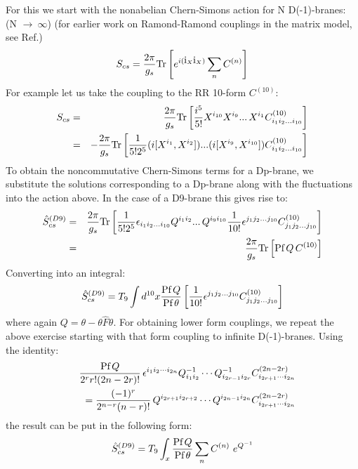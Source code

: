 \documentclass[a4paper,a4paper]{amsproc}
\theoremstyle{definition}
\theoremstyle{remark}
\numberwithin{equation}{section}
\begin{document}
For this we start with the nonabelian Chern-Simons action for N D(-1)-branes:
(N $\rightarrow ~\infty$) \cite{myers} (for earlier work on
Ramond-Ramond couplings in the matrix model, see Ref.\cite{morariu})
%
\begin{equation}
S_{cs} = \frac{2\pi}{g_s} \hbox{Tr}\left[ e^{i(\hbox{i}_X
\hbox{i}_X)}\sum_n C^{(n)}\right]
\end{equation}
%
For example let us take the coupling to the RR 10-form  $C^{(10)}$:
%
\begin{eqnarray}
S_{cs} &=& \frac{2\pi}{g_s}\hbox{Tr}\left[ {\frac{i^5}{5!}}
X^{i_{10}}X^{i_9}...\, X^{i_1} C^{(10)}_{i_1i_2...i_{10}}\right] \cr
&=& -\frac{2\pi}{g_s}\hbox{Tr}\left[{\frac{1}{5! 2^5}}(i[X^{i_1},
X^{i_2}])...(i[X^{i_9},X^{i_{10}}]) C^{(10)}_{i_1i_2...i_{10}}\right]
\end{eqnarray}
%
To obtain the noncommutative Chern-Simons terms for a Dp-brane, we
substitute the solutions corresponding to a Dp-brane along with the
fluctuations into the action above. In the case of a D9-brane this
gives rise to:
%
\begin{eqnarray}
\hat S_{cs}^{(D9)} &=&
\frac{2\pi}{g_s}\hbox{Tr}\left[{\frac{1}{5!2^5}}
\epsilon_{i_1i_2...i_{10}} Q^{i_1i_2}...\,Q^{i_9i_{10}}
{\frac{1}{10!}}\epsilon^{j_1j_2...j_{10}}C^{(10)}_{j_1j_2...j_{10}}
\right]\cr
&=& \frac{2\pi}{g_s}\hbox{Tr}\left[\hbox{Pf}\,Q \,C^{(10)} \right]
\end{eqnarray}
%
Converting into an integral:
%
\begin{eqnarray}
\hat S_{cs}^{(D9)} = T_9\int{{d^{10}x}
{\frac{\hbox{Pf}\,Q}{\hbox{Pf}\,\theta}}\left[{\frac{1}{10!}}
\epsilon^{j_1j_2...j_{10}}C^{(10)}_{j_1j_2...j_{10}}\right]}
\end{eqnarray}
%
where again $Q = \theta - \theta \hat F \theta$.
For obtaining lower form couplings, we repeat the above exercise
starting with that form coupling to infinite D(-1)-branes.
%
Using the identity:
%
\begin{eqnarray}
&&\frac{\hbox{Pf}\,Q}{2^r r!(2n-2r)!}\,\epsilon^{i_1i_2\cdots i_{2n}}
Q^{-1}_{i_1i_2}\cdots Q^{-1}_{i_{2r-1}i_{2r}}
C^{(2n-2r)}_{i_{2r+1}\cdots i_{2n}} \cr
&& = 
\frac{(-1)^r}{2^{n-r}(n-r)!}\, Q^{i_{2r+1}i_{2r+2}}\cdots
Q^{i_{2n-1}i_{2n}} C^{(2n-2r)}_{i_{2r+1}\cdots i_{2n}}
\end{eqnarray}
%
the result can be put in the following form:
%
\begin{equation}
\hat{S}_{cs}^{(D9)} = T_9 \int_x \frac{\hbox{Pf}\, Q}{\hbox{Pf}\,\theta}
\sum_n C^{(n)}~ e^{Q^{-1}}
\end{equation}
\end{document}
